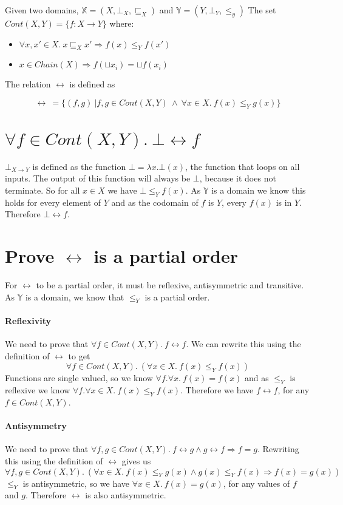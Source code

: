 Given two domains, $\mathbb{X} = (X, \bot_X, \sqsubseteq_X)$ and $\mathbb{Y} = (Y, \bot_Y, \leq_y)$ The set $Cont(X,Y) =\{ f : X \to Y\}$ where:

\begin{itemize}
\item{$\forall x, x' \in X. \ x \sqsubseteq_X x' \Rightarrow f(x) \leq_Y f(x')$}
\item{$x \in Chain(X) \Rightarrow f(\sqcup x_i) = \sqcup f(x_i)$}
\end{itemize} 

The relation $\rel$ is defined as

\[ \rel  \ = \{ (f , g) \ | f,g \in Cont(X,Y) \ \wedge \ \forall x \in X. \ f(x) \leq_Y g(x)\} \]

\section{$\forall f \in Cont(X,Y). \ \bot \rel f$ }
$\bot_{X \to Y}$ is defined as the function $\bot = \lambda x. \bot (x)$, the function that loops on all inputs. The output of this function will always be $\bot$, because it does not terminate.  So for all $x \in X$ we have $\bot \leq_Y f(x)$. As $\mathbb{Y}$ is a domain we know this holds for every element of $Y$ and as the codomain of $f$ is $Y$, every $f(x)$ is in $Y$. Therefore $\bot \rel f$.
\section{Prove $\rel$ is a partial order}
For $\rel$ to be a partial order, it must be reflexive, antisymmetric and transitive. As $\mathbb{Y}$ is a domain, we know that $\leq_Y$ is a partial order.

\paragraph{Reflexivity}
We need to prove that $\forall f \in Cont(X,Y). \ f \rel f$. We can rewrite this using the definition of $\rel$ to get 
\[\forall f \in Cont(X,Y). \ (\forall x \in X. \ f(x) \leq_Y f(x))\]
 Functions are single valued, so we know $\forall f. \forall x. \ f(x) = f(x)$ and as $\leq_Y$ is reflexive we know $\forall f. \forall x \in X. \ f(x) \leq_Y f(x)$. Therefore we have $f \rel f$, for any $f \in Cont(X,Y)$. 

\paragraph{Antisymmetry}
We need to prove that $\forall f,g \in Cont(X,Y). \ f \rel g \wedge g \rel f \Rightarrow f = g$. Rewriting this using the definition of $\rel$ gives us
 \[\forall f,g \in Cont(X,Y). \ (\forall x \in X. \ f(x) \leq_Y g(x) \wedge g(x) \leq_Y f(x) \Rightarrow f(x) = g(x))\] 
 $\leq_Y$ is antisymmetric, so we have $\forall x \in X. \ f(x) = g(x)$, for any values of $f$ and $g$. Therefore $\rel$ is also antisymmetric. 


